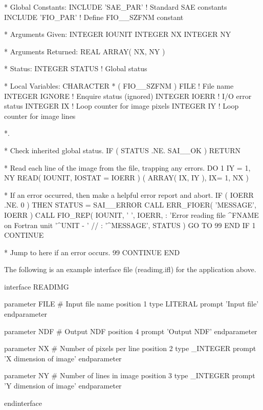 \documentclass[twoside,11pt,nolof]{starlink}
\begin{document}
\begin{terminalv}
*  Global Constants:
      INCLUDE 'SAE_PAR'          ! Standard SAE constants
      INCLUDE 'FIO_PAR'          ! Define FIO__SZFNM constant

*  Arguments Given:
      INTEGER IOUNIT
      INTEGER NX
      INTEGER NY

*  Arguments Returned:
      REAL ARRAY( NX, NY )

*  Status:
      INTEGER STATUS             ! Global status

*  Local Variables:
      CHARACTER * ( FIO__SZFNM ) FILE ! File name
      INTEGER IGNORE             ! Enquire status (ignored)
      INTEGER IOERR              ! I/O error status
      INTEGER IX                 ! Loop counter for image pixels
      INTEGER IY                 ! Loop counter for image lines

*.

*  Check inherited global status.
      IF ( STATUS .NE. SAI__OK ) RETURN

*  Read each line of the image from the file, trapping any errors.
      DO 1 IY = 1, NY
         READ( IOUNIT, IOSTAT = IOERR ) ( ARRAY( IX, IY ), IX= 1, NX )

*  If an error occurred, then make a helpful error report and abort.
         IF ( IOERR .NE. 0 ) THEN
            STATUS = SAI__ERROR
            CALL ERR_FIOER( 'MESSAGE', IOERR )
            CALL FIO_REP( IOUNIT, ' ', IOERR,
     :      'Error reading file ^FNAME on Fortran unit '^UNIT - ' //
     :      '^MESSAGE', STATUS )
            GO TO 99
         END IF
 1    CONTINUE

*  Jump to here if an error occurs.
 99   CONTINUE
      END
\end{terminalv}
\normalsize

The following is an example  interface file
(readimg.ifl) for the application above.

\small
\begin{terminalv}
interface READIMG

   parameter FILE                # Input file name
      position 1
      type     LITERAL
      prompt   'Input file'
   endparameter

   parameter NDF                 # Output NDF
      position 4
      prompt   'Output NDF'
   endparameter

   parameter NX                  # Number of pixels per line
      position 2
      type     _INTEGER
      prompt   'X dimension of image'
   endparameter

   parameter NY                  # Number of lines in image
      position 3
      type     _INTEGER
      prompt   'Y dimension of image'
   endparameter

endinterface
\end{terminalv}
\normalsize
\end{document}
